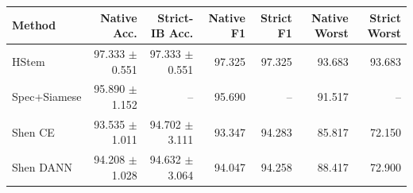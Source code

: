 \begin{tabular}{lrrrrrr}
\toprule Method & Native Acc. & Strict-IB Acc. & Native F1 & Strict F1 & Native Worst & Strict Worst\\
\midrule
HStem & 97.333 $\pm$ 0.551 & 97.333 $\pm$ 0.551 & 97.325 & 97.325 & 93.683 & 93.683\\
Spec+Siamese & 95.890 $\pm$ 1.152 & -- & 95.690 & -- & 91.517 & --\\
Shen CE & 93.535 $\pm$ 1.011 & 94.702 $\pm$ 3.111 & 93.347 & 94.283 & 85.817 & 72.150\\
Shen DANN & 94.208 $\pm$ 1.028 & 94.632 $\pm$ 3.064 & 94.047 & 94.258 & 88.417 & 72.900\\
\bottomrule
\end{tabular}
